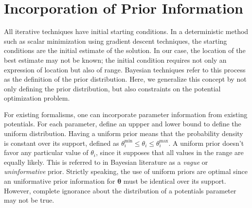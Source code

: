 \section{Incorporation of Prior Information}
\label{sec:prior_information}

All iterative techniques have initial starting conditions.  In a deterministic method such as scalar minimization using gradient descent techniques, the starting conditions are the initial estimate of the solution.  In our case, the location of the best estimate may not be known; the initial condition requires not only an expression of location but also of range.  Bayesian techniques refer to this process as the definition of the prior distribution.  Here, we generalize this concept by not only defining the prior distribution, but also constraints on the potential optimization problem.

For existing formalisms, one can incorporate parameter information from existing potentials.  For each parameter, define an uppper and lower bound to define the uniform distribution.  Having a uniform prior means that the probability density is constant over its support, defined as $\theta_{i}^{\text{min}} \leq \theta_i \leq \theta_{i}^{\text{max}}.$  A uniform prior doesn't favor any particular value of $\theta_i$, since it supposes that all values in the range are equally likely.  This is referred to in Bayesian literature as a \emph{vague} or \emph{uninformative} prior.  Strictly speaking, the use of uniform priors are optimal since an uniformative prior information for $\bm{\theta}$ must be identical over its support.    However, complete ignorance about the distribution of a potentials parameter may not be true.

